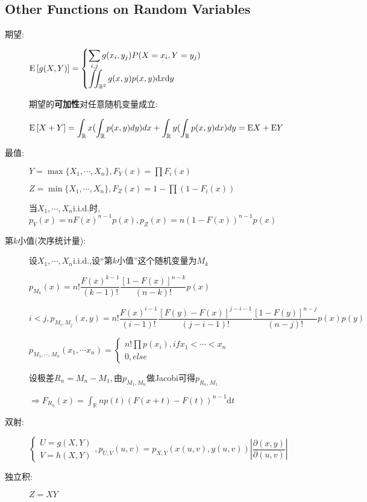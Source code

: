 \subsection{Other Functions on Random Variables}
\begin{description}
  \item[期望:]
    $ \E{g(X,Y)}=\begin{cases}\sum_{i,j}g(x_i,y_j)P(X=x_i,Y=y_j)\\\iint_{\mathbb{R}^2}g(x,y)p(x,y)\mathrm{d}x\mathrm{d}y \end{cases}$

    期望的\textbf{可加性}对任意随机变量成立:

    $
    \E{X+Y}=\int_{\mathbb{R}}x(\int_{\mathbb{R}}p(x,y)dy)dx+\int_{\mathbb{R}}y(\int_{\mathbb{R}}p(x,y)dx)dy
    = \Ex{X}+\Ex{Y}$

  \item[最值:]
    $ Y=\max\{ X_1,\cdots, X_n\}, F_Y(x) = \prod{F_i(x)}$

    $ Z = \min\{ X_1,\cdots ,X_n\}, F_Z(x) = 1-\prod{(1-F_i(x))}$

    当$ X_1,\cdots ,X_n$i.i.d.时,$ p_Y(x)=nF(x)^{n-1}p(x), p_Z(x)=n(1-F(x))^{n-1}p(x)$
  \item[第$ k$小值(次序统计量):]设$ X_1,\cdots ,X_n$i.i.d.,设``第$ k$小值''这个随机变量为$ M_k$

      $ p_{M_k}(x)=n!\dfrac{F(x)^{k-1}}{(k-1)!}\dfrac{[1-F(x)]^{n-k}}{(n-k)!}p(x)$

      $i<j, p_{M_i,M_j}(x,y)=n!\dfrac{F(x)^{i-1}}{(i-1)!}\dfrac{[F(y)-F(x)]^{j-i-1}}{(j-i-1)!}\dfrac{[1-F(y)]^{n-j}}{(n-j)!}p(x)p(y)$

      $ p_{M_1,\cdots ,M_n}(x_1,\cdots x_n)=\begin{cases}n!\prod{p(x_i)},if x_1<\cdots <x_n\\0,else \end{cases}$

      设极差$ R_n = M_n - M_1, $由$ p_{M_1,M_n}$做Jacobi可得$ p_{R_n,M_1}$

      $\Rightarrow F_{R_n}(x) = \int_{\mathbb{R}}np(t)(F(x+t)-F(t))^{n-1}\mathrm{d}t $
  \item[双射:]
   $ \begin{cases}U=g(X,Y)\\V=h(X,Y)\end{cases},p_{U,V}(u,v) = p_{X,Y}(x(u,v),y(u,v))|\dfrac{\partial(x,y)}{\partial(u,v)}|$

  \item[独立积:]$ Z=XY$\hfill


\end{description}
